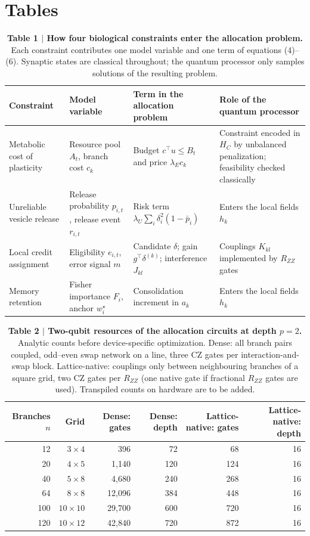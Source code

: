 \clearpage
\section*{Tables}

\begin{table}[h]
\caption*{\textbf{Table 1 $|$ How four biological constraints enter the allocation problem.} Each constraint contributes one model variable and one term of equations (4)--(6). Synaptic states are classical throughout; the quantum processor only samples solutions of the resulting problem.}
\small
\begin{tabular}{p{2.6cm}p{3.6cm}p{4.6cm}p{4.0cm}}
\toprule
Constraint & Model variable & Term in the allocation problem & Role of the quantum processor \\
\midrule
Metabolic cost of plasticity & Resource pool $A_{t}$, branch cost $c_{k}$ & Budget $c^{\top}u\le B_{t}$ and price $\lambda_{E}c_{k}$ & Constraint encoded in $H_{C}$ by unbalanced penalization; feasibility checked classically \\
Unreliable vesicle release & Release probability $p_{i,t}$, release event $r_{i,t}$ & Risk term $\lambda_{U}\sum_{i}\delta_{i}^{2}(1-\bar p_{i})$ & Enters the local fields $h_{k}$ \\
Local credit assignment & Eligibility $e_{i,t}$, error signal $m$ & Candidate $\delta$; gain $g^{\top}\delta^{(k)}$; interference $J_{kl}$ & Couplings $K_{kl}$ implemented by $R_{ZZ}$ gates \\
Memory retention & Fisher importance $F_{i}$, anchor $w_{i}^{\star}$ & Consolidation increment in $a_{k}$ & Enters the local fields $h_{k}$ \\
\bottomrule
\end{tabular}
\end{table}

\begin{table}[h]
\caption*{\textbf{Table 2 $|$ Two-qubit resources of the allocation circuits at depth $p=2$.} Analytic counts before device-specific optimization. Dense: all branch pairs coupled, odd--even swap network on a line, three CZ gates per interaction-and-swap block. Lattice-native: couplings only between neighbouring branches of a square grid, two CZ gates per $R_{ZZ}$ (one native gate if fractional $R_{ZZ}$ gates are used). Transpiled counts on hardware are to be added.}
\small
\begin{tabular}{rrrrrr}
\toprule
Branches $n$ & Grid & Dense: gates & Dense: depth & Lattice-native: gates & Lattice-native: depth \\
\midrule
12 & $3\times4$ & 396 & 72 & 68 & 16 \\
20 & $4\times5$ & 1,140 & 120 & 124 & 16 \\
40 & $5\times8$ & 4,680 & 240 & 268 & 16 \\
64 & $8\times8$ & 12,096 & 384 & 448 & 16 \\
100 & $10\times10$ & 29,700 & 600 & 720 & 16 \\
120 & $10\times12$ & 42,840 & 720 & 872 & 16 \\
\bottomrule
\end{tabular}
\end{table}

